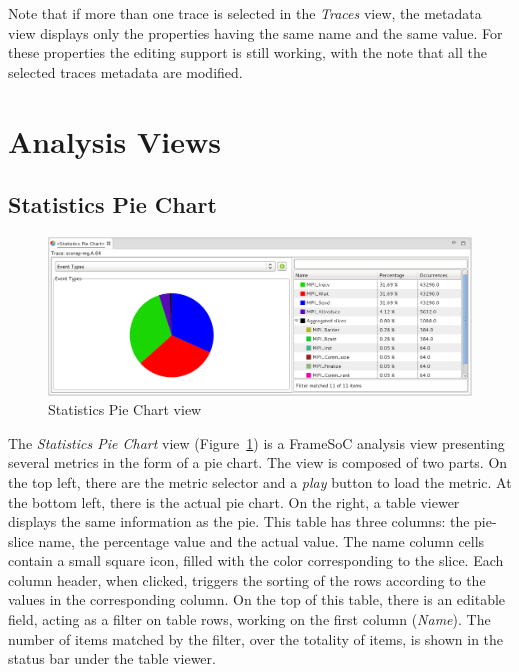 \documentclass[twoside]{article}
\begin{document}
\begin{sloppypar}
Note that if more than one trace is selected in the \emph{Traces} view, the metadata view displays only the properties having the same name and the same value. 
For these properties the editing support is still working, with the note that all the selected traces metadata are modified.


\section{Analysis Views}
\label{sec:analysis}

\subsection{Statistics Pie Chart}
\label{subsec:pie}

\begin{figure}[h!]
  \centering
    \includegraphics[width=1.0\textwidth]{images/pie_chart.png}
  \caption{Statistics Pie Chart view}
  \label{fig:pie_chart}
\end{figure}

The \emph{Statistics Pie Chart} view (Figure~\ref{fig:pie_chart}) is a FrameSoC analysis view presenting several metrics in the form of a pie chart.
The view is composed of two parts.
On the top left, there are the metric selector and a \emph{play} button to load the metric. 
At the bottom left, there is the actual pie chart.
On the right, a table viewer displays the same information as the pie. 
This table has three columns: the pie-slice name, the percentage value and the actual value. 
The name column cells contain a small square icon, filled with the color corresponding to the slice.
Each column header, when clicked, triggers the sorting of the rows according to the values in the corresponding column.
On the top of this table, there is an editable field, acting as a filter on table rows, working on the first column (\emph{Name}).
The number of items matched by the filter, over the totality of items, is shown in the status bar under the table viewer.


\end{sloppypar}
\end{document}
